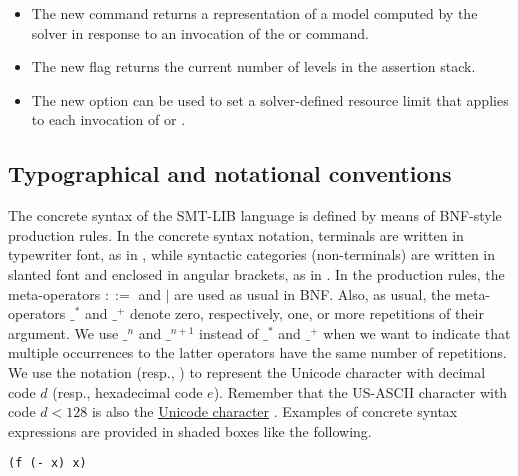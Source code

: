\begin{itemize}
\item
The new command  returns a representation of a model computed
by the solver in response to an invocation of the  or 
 command.

\item
The new  flag  returns 
the current number of levels in the assertion stack.

\item
The new option  can be used to set 
a solver-defined resource limit that applies to each invocation of 
 or .

\end{itemize}





\subsection{Typographical and notational conventions}

The concrete syntax of the SMT-LIB language is defined
by means of BNF-style production rules.
In the concrete syntax notation,
terminals are written in typewriter font, as in ,
while syntactic categories (non-terminals) are written 
in slanted font and enclosed in angular brackets, as in .
In the production rules, the meta-operators $::=$ and $\mid$ are used as usual 
in BNF. 
Also, as usual, the meta-operators $\_^*$ and $\_^+$ denote zero, respectively, 
one, or more repetitions of their argument.
We use $\_^n$ and $\_^{n+1}$ instead of $\_^*$ and $\_^+$ 
when we want to indicate that multiple occurrences to the latter operators 
have the same number of repetitions.
We use the notation  (resp., ) to represent 
the Unicode character with decimal code $d$ (resp., hexadecimal code $e$).  Remember that the US-ASCII character with code $d < 128$ is also 
the \href{http://www.utf8-chartable.de/unicode-utf8-table.pl?utf8=dec}{Unicode character} .
Examples of concrete syntax expressions are provided in shaded boxes like the following.
\begin{lstlisting}[linewidth=10em]
(f (- x) x) 
\end{lstlisting}
 
